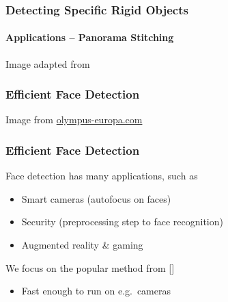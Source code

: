 \documentclass[xetex,professionalfont]{beamer}
\begin{document}
\begin{frame}
\frametitle{Detecting Specific Rigid Objects}
\framesubtitle{Applications -- Panorama Stitching}

\begin{center}
    {\centering Image adapted from \cite{brown2007}}
\end{center}

\end{frame}


\begin{frame}
\frametitle{Efficient Face Detection} %

\begin{center}
    {\centering Image from \url{olympus-europa.com}}
\end{center}

\end{frame}


\begin{frame}
\frametitle{Efficient Face Detection}

Face detection has many applications, such as
\begin{itemize}
    \item Smart cameras (autofocus on faces)
    \item Security (preprocessing step to face recognition)
    \item Augmented reality \& gaming
\end{itemize}

\bigskip
We focus on the popular method from [\cite{viola2001}]
\begin{itemize}
    \item Fast enough to run on e.g.\ cameras
\end{itemize}

\end{frame}
\end{document}
